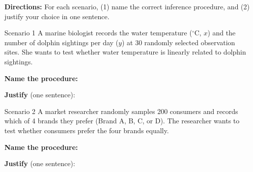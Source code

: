 \documentclass[10pt]{article}
\begin{document}
\namedateperiod

\vspace{0.1in}

\textbf{Directions:} For each scenario, (1) name the correct inference procedure, and
(2) justify your choice in one sentence.

\begin{notesbox}{Scenario 1}
A marine biologist records the water temperature ($^\circ$C, $x$) and the number of dolphin
sightings per day ($y$) at 30 randomly selected observation sites. She wants to test whether
water temperature is linearly related to dolphin sightings.

\vspace{0.1in}
\textbf{Name the procedure:} \blank{8cm}

\vspace{0.1in}
\textbf{Justify} (one sentence):
\end{notesbox}

\begin{notesbox}{Scenario 2}
A market researcher randomly samples 200 consumers and records which of 4 brands they
prefer (Brand A, B, C, or D). The researcher wants to test whether consumers prefer the
four brands equally.

\vspace{0.1in}
\textbf{Name the procedure:} \blank{8cm}

\vspace{0.1in}
\textbf{Justify} (one sentence):
\end{notesbox}
\end{document}
